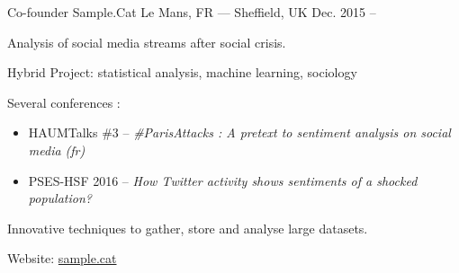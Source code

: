 \begin{cventries}
  \cventry
    {Co-founder} %
    {Sample.Cat} %
		{Le Mans, FR --- Sheffield, UK} %
    {Dec. 2015 --} %
    {
      \begin{cvitems} %
				\item {Analysis of social media streams after social crisis.}
				\item {Hybrid Project: statistical analysis, machine learning, sociology}
				\item {Several conferences :\begin{itemize}
						\item HAUMTalks \#3 -- \textit{\#ParisAttacks : A pretext to sentiment analysis on social media (fr)}
						\item PSES-HSF 2016 -- \textit{How Twitter activity shows sentiments of a shocked population?}
				\end{itemize}}
				\item {Innovative techniques to gather, store and analyse large datasets.}
				\item {Website: \href{https://sample.cat}{sample.cat}}
      \end{cvitems}
    }

\end{cventries}
